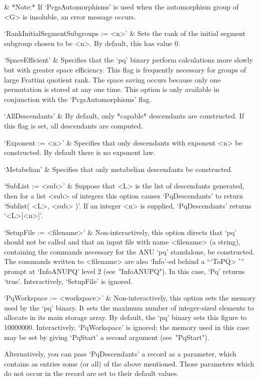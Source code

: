 &
*Note:*
If `PcgsAutomorphisms' is used when the  automorphism  group  of  <G>  is
insoluble, an error message occurs.

`RankInitialSegmentSubgroups := <n>' &
Sets the rank of the initial  segment  subgroup  chosen  to  be  <n>.  By
default, this has value 0.

`SpaceEfficient' &
Specifies that the `pq' binary perform calculations more slowly but  with
greater space efficiency. This flag is frequently necessary for groups of
large Frattini quotient rank. The space saving occurs  because  only  one
permutation is stored at any one time. This option is only  available  in
conjunction with the `PcgsAutomorphisms' flag.

`AllDescendants' &
By default, only *capable* descendants are constructed. If this  flag  is
set, all descendants are computed.

`Exponent := <n>' &
Specifies that only descendants with  exponent  <n>  be  constructed.  By
default there is no exponent law.

`Metabelian' &
Specifies that only metabelian descendants be constructed.

`SubList := <sub>' &
Suppose that <L> is the list of descendants generated, then  for  a  list
<sub> of integers this option causes `PqDescendants' to return  `Sublist(
<L>, <sub> )'. If an integer <n>  is  supplied,  `PqDescendants'  returns
`<L>[<n>]'.

`SetupFile := <filename>' &
Non-interactively, this option directs that `pq' should not be called and
that an input file  with  name  <filename>  (a  string),  containing  the
commands necessary for the  ANU  `pq'  standalone,  be  constructed.  The
commands written to <filename> are also `Info'-ed behind  a  ```ToPQ> '''
prompt at `InfoANUPQ' level  2  (see~"InfoANUPQ").  In  this  case,  `Pq'
returns `true'. Interactively, `SetupFile' is ignored.

`PqWorkspace := <workspace>' &
Non-interactively, this option sets the memory used by the  `pq'  binary.
It sets the maximum number of integer-sized elements to allocate  in  its
main storage array. By default, the  `pq'  binary  sets  this  figure  to
10000000. Interactively, `PqWorkspace' is ignored;  the  memory  used  in
this  case  may  be  set  by   giving   `PqStart'   a   second   argument
(see~"PqStart").

\enditems

Alternatively,  you can pass `PqDescendants'  a record  as  a  parameter,
which  contains  as  entries some (or all) of the above mentioned.  Those
parameters  which do not occur  in  the record are  set  to their default
values.

